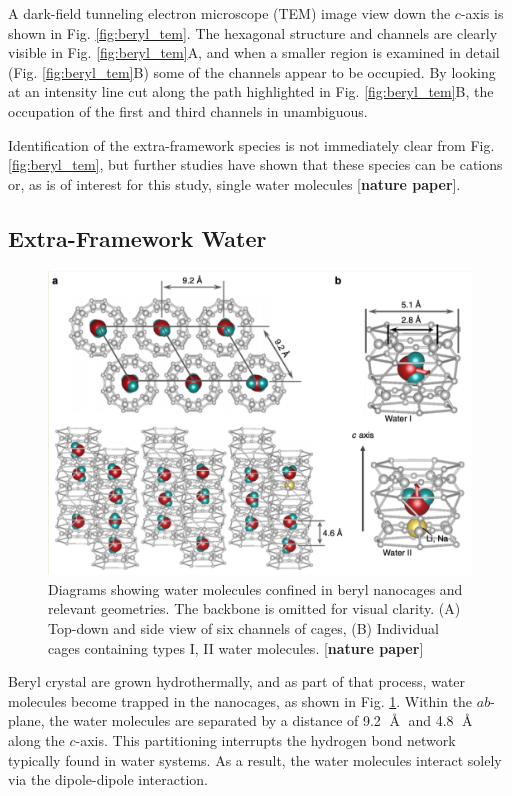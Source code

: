         A dark-field tunneling electron microscope (TEM) image view down the $c$-axis is shown in Fig. \ref{fig:beryl_tem}. The hexagonal structure and channels are clearly visible in Fig. \ref{fig:beryl_tem}A, and when a smaller region is examined in detail (Fig. \ref{fig:beryl_tem}B) some of the channels appear to be occupied. By looking at an intensity line cut along the path highlighted in Fig. \ref{fig:beryl_tem}B, the occupation of the first and third channels in unambiguous. 
        
        Identification of the extra-framework species is not immediately clear from Fig. \ref{fig:beryl_tem}, but further studies have shown that these species can be cations or, as is of interest for this study, single water molecules [\textbf{nature paper}].
        
        \subsection{Extra-Framework Water}
        
        \begin{figure}
            \centering
            \includegraphics[width=0.9\linewidth]{Figures/System/beryl_water.png}
            \caption{Diagrams showing water molecules confined in beryl nanocages and relevant geometries. The backbone is omitted for visual clarity. (A) Top-down and side view of six channels of cages, (B) Individual cages containing types I, II water molecules. [\textbf{nature paper}]}
            \label{fig:beryl_water}
        \end{figure}
        
        Beryl crystal are grown hydrothermally, and as part of that process, water molecules become trapped in the nanocages, as shown in Fig. \ref{fig:beryl_water}. Within the $ab$-plane, the water molecules are separated by a distance of 9.2 $\Angstrom$ and 4.8 $\Angstrom$ along the $c$-axis. This partitioning interrupts the hydrogen bond network typically found in water systems. As a result, the water molecules interact solely via the dipole-dipole interaction. 
        
